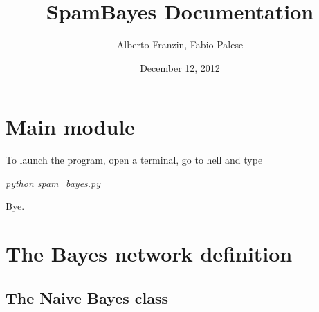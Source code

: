 \documentclass[letterpaper,10pt,english]{sphinxmanual}
\title{SpamBayes Documentation}
\date{December 12, 2012}
\author{Alberto Franzin, Fabio Palese}
\begin{document}
\maketitle
\tableofcontents
{}\label{index::doc}



\chapter{Main module}
\label{index:main-module}\label{index:spambayes-s-documentation}
To launch the program, open a terminal, go to hell and type

\emph{python spam\_bayes.py}

Bye.
\label{index:module-spam_bayes}

\chapter{The Bayes network definition}
\label{index:the-bayes-network-definition}

\section{The Naive Bayes class}
\label{index:module-naive_bayes}\label{index:the-naive-bayes-class}
\end{document}
